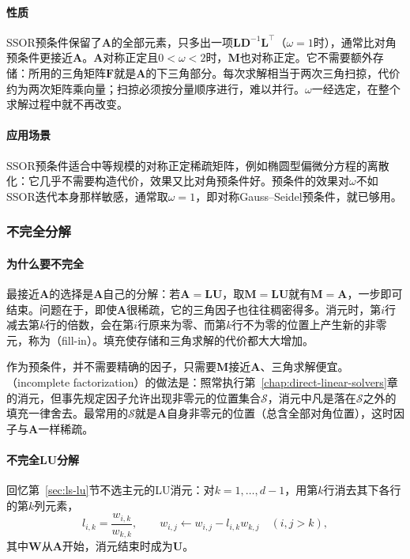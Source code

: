 \paragraph{性质}
SSOR预条件保留了$\bm A$的全部元素，只多出一项$\bm L\bm D^{-1}\bm L^\top$（$\omega=1$时），通常比对角预条件更接近$\bm A$。$\bm A$对称正定且$0<\omega<2$时，$\bm M$也对称正定。它不需要额外存储：所用的三角矩阵$\bm F$就是$\bm A$的下三角部分。每次求解相当于两次三角扫掠，代价约为两次矩阵乘向量；扫掠必须按分量顺序进行，难以并行。$\omega$一经选定，在整个求解过程中就不再改变。

\paragraph{应用场景}
SSOR预条件适合中等规模的对称正定稀疏矩阵，例如椭圆型偏微分方程的离散化：它几乎不需要构造代价，效果又比对角预条件好。预条件的效果对$\omega$不如SSOR迭代本身那样敏感，通常取$\omega=1$，即对称Gauss--Seidel预条件，就已够用。

\subsubsection{不完全分解}

\paragraph{为什么要不完全}
最接近$\bm A$的选择是$\bm A$自己的分解：若$\bm A=\bm L\bm U$，取$\bm M=\bm L\bm U$就有$\bm M=\bm A$，一步即可结束。问题在于，即使$\bm A$很稀疏，它的三角因子也往往稠密得多。消元时，第$i$行减去第$k$行的倍数，会在第$i$行原来为零、而第$k$行不为零的位置上产生新的非零元，称为（fill-in）。填充使存储和三角求解的代价都大大增加。

作为预条件，并不需要精确的因子，只需要$\bm M$接近$\bm A$、三角求解便宜。（incomplete factorization）的做法是：照常执行第~\ref{chap:direct-linear-solvers}章的消元，但事先规定因子允许出现非零元的位置集合$\mathcal S$，消元中凡是落在$\mathcal S$之外的填充一律舍去。最常用的$\mathcal S$就是$\bm A$自身非零元的位置（总含全部对角位置），这时因子与$\bm A$一样稀疏。

\paragraph{不完全LU分解}
回忆第~\ref{sec:ls-lu}节不选主元的LU消元：对$k=1,\ldots,d-1$，用第$k$行消去其下各行的第$k$列元素，
\[
 l_{i,k}=\frac{w_{i,k}}{w_{k,k}},\qquad
 w_{i,j}\leftarrow w_{i,j}-l_{i,k}w_{k,j}\quad(i,j>k),
\]
其中$\bm W$从$\bm A$开始，消元结束时成为$\bm U$。


